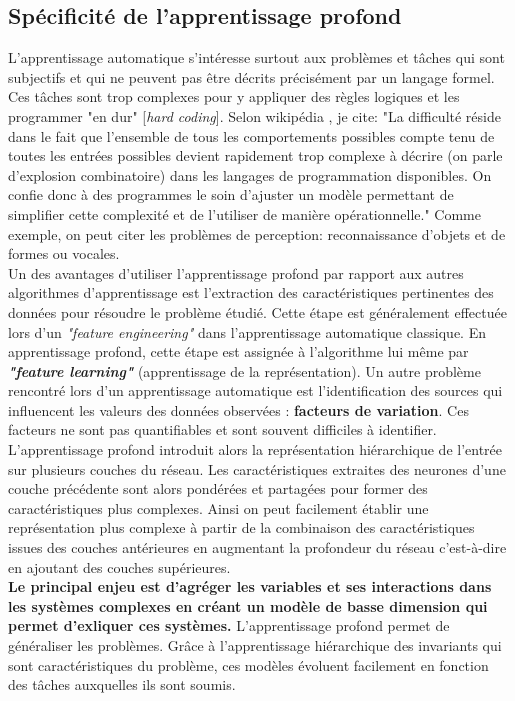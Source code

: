 \subsection{Spécificité de l'apprentissage profond}
L'apprentissage automatique s'intéresse surtout aux problèmes et tâches qui sont subjectifs et qui ne peuvent pas être décrits précisément par un langage formel. Ces tâches sont trop complexes pour y appliquer des règles logiques et les programmer "en dur" [\textit{hard coding}]. Selon wikipédia  \cite{wikipediaapprentissage}, je cite: "La difficulté réside dans le fait que l'ensemble de tous les comportements possibles compte tenu de toutes les entrées possibles devient rapidement trop complexe à décrire (on parle d'explosion combinatoire) dans les langages de programmation disponibles. On confie donc à des programmes le soin d'ajuster un modèle permettant de simplifier cette complexité et de l'utiliser de manière opérationnelle." Comme exemple, on peut citer les problèmes de perception: reconnaissance d'objets et de formes ou vocales.\\
\qquad Un des avantages d'utiliser l'apprentissage profond par rapport aux autres algorithmes d'apprentissage est l'extraction des caractéristiques pertinentes des données pour résoudre le problème étudié. Cette étape est généralement effectuée lors d'un \textit{"feature engineering"} dans l'apprentissage automatique classique. En apprentissage profond, cette étape est assignée à l'algorithme lui même par  \textit{\textbf{"feature learning"}} (apprentissage de la représentation). Un autre problème rencontré lors d'un apprentissage automatique est l'identification des sources qui influencent les valeurs des données observées : \textbf{facteurs de variation}. Ces facteurs ne sont pas quantifiables et sont souvent difficiles à identifier. L'apprentissage profond introduit alors la représentation hiérarchique de l'entrée sur plusieurs couches du réseau. Les caractéristiques extraites des neurones d'une couche précédente sont alors pondérées et partagées pour former des caractéristiques plus complexes. Ainsi on peut facilement établir une représentation plus complexe à partir de la combinaison des caractéristiques issues des couches antérieures en augmentant la profondeur du réseau c'est-à-dire en ajoutant des couches supérieures.\\
\textbf{Le principal enjeu est d'agréger les variables et ses interactions dans les systèmes complexes en créant un modèle de basse dimension qui permet d'exliquer ces systèmes.}
L'apprentissage profond permet de généraliser les problèmes. Grâce à l'apprentissage hiérarchique des invariants qui sont caractéristiques du problème, ces modèles évoluent facilement en fonction des tâches auxquelles ils sont soumis.\\
\smallskip

